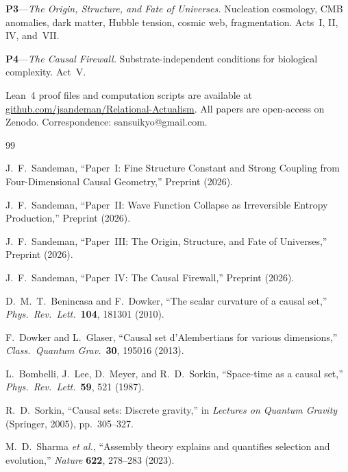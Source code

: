 \documentclass[11pt,a4paper]{article}
\theoremstyle{plain}
\theoremstyle{definition}
\theoremstyle{remark}
\begin{document}
\textbf{P3}---\emph{The Origin, Structure, and Fate of Universes.}
Nucleation cosmology, CMB anomalies, dark matter, Hubble tension, cosmic
web, fragmentation.  Acts~I, II, IV, and~VII.

\textbf{P4}---\emph{The Causal Firewall.}  Substrate-independent
conditions for biological complexity.  Act~V.

\medskip\noindent
Lean~4 proof files and computation scripts are available at
\url{github.com/jsandeman/Relational-Actualism}.  All papers are
open-access on Zenodo.  Correspondence: sansuikyo@gmail.com.

\begin{thebibliography}{99}

J.~F.~Sandeman,
``Paper~I: Fine Structure Constant and Strong Coupling from
Four-Dimensional Causal Geometry,''
Preprint (2026).

J.~F.~Sandeman,
``Paper~II: Wave Function Collapse as Irreversible Entropy Production,''
Preprint (2026).

J.~F.~Sandeman,
``Paper~III: The Origin, Structure, and Fate of Universes,''
Preprint (2026).

J.~F.~Sandeman,
``Paper~IV: The Causal Firewall,''
Preprint (2026).

D.~M.~T.~Benincasa and F.~Dowker,
``The scalar curvature of a causal set,''
\textit{Phys.\ Rev.\ Lett.}\ \textbf{104}, 181301 (2010).

F.~Dowker and L.~Glaser,
``Causal set d'Alembertians for various dimensions,''
\textit{Class.\ Quantum Grav.}\ \textbf{30}, 195016 (2013).

L.~Bombelli, J.~Lee, D.~Meyer, and R.~D.~Sorkin,
``Space-time as a causal set,''
\textit{Phys.\ Rev.\ Lett.}\ \textbf{59}, 521 (1987).

R.~D.~Sorkin,
``Causal sets: Discrete gravity,''
in \textit{Lectures on Quantum Gravity}
(Springer, 2005), pp.~305--327.

M.~D.~Sharma \textit{et al.},
``Assembly theory explains and quantifies selection and evolution,''
\textit{Nature} \textbf{622}, 278--283 (2023).

\end{thebibliography}
\end{document}
